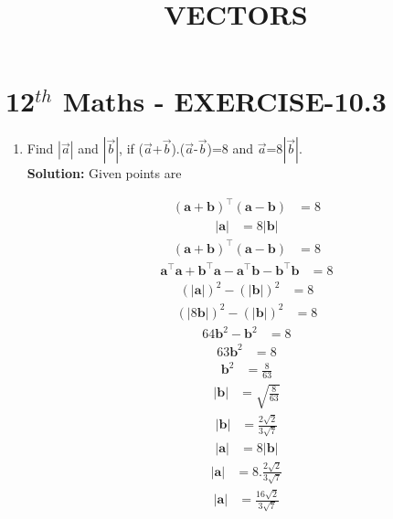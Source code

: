 \documentclass[10pt]{article}
\newcommand{\solution}{\noindent \textbf{Solution: }}
\providecommand{\abs}[1]{\left\vert#1\right\vert}
\let\vec\mathbf{}
\begin{document}
\begin{center}
\title{\textbf{VECTORS}}
\date{\vspace{-5ex}} %
\maketitle
\end{center}

\section{12$^{th}$ Maths - EXERCISE-10.3}

\begin{enumerate}
\item Find $\abs{\overrightarrow{a}}$ and $\abs{\overrightarrow{b}}$, if ($\overrightarrow{a}$+$\overrightarrow{b}$)$.$($\overrightarrow{a}$-$\overrightarrow{b}$)=8 and ${\overrightarrow{a}}$=8$\abs{\overrightarrow{b}}$.\\  

\solution
Given  points are

\begin{align}
(\vec{a}+\vec{b})^{\top}(\vec{a}-\vec{b})&=8
\end{align}
\begin{align}
\abs{\vec{a}}&=8\abs{\vec{b}}
\end{align}
\begin{align}
(\vec{a}+\vec{b})^{\top}(\vec{a}-\vec{b})&=8
\end{align}
\begin{align}
\vec{a}^{\top}\vec{a}+\vec{b}^{\top}\vec{a}-\vec{a}^{\top}\vec{b}-\vec{b}^{\top}\vec{b}&=8
\end{align}
\begin{align}
(\abs{\vec{a}})^2-(\abs{\vec{b}})^2&=8
\end{align}
\begin{align}
(\abs{8\vec{b}})^2-(\abs{\vec{b}})^2&=8
\end{align}
\begin{align}
64{\vec{b}}^2-\vec{b}^2&=8
\end{align}
\begin{align}
63{\vec{b}}^2&=8
\end{align}
\begin{align}
\vec{b}^2&=\frac{8}{63}
\end{align}
\begin{align}
\abs{\vec{b}}&=\sqrt{\frac{8}{63}}
\end{align}
\begin{align}
\abs{\vec{b}}&=\frac{2\sqrt{2}}{3\sqrt{7}}
\end{align}
\begin{align}
\abs{\vec{a}}&=8\abs{\vec{b}}
\end{align}
\begin{align}
\abs{\vec{a}}&=8.\frac{2\sqrt{2}}{3\sqrt{7}}
\end{align}
\begin{align}
\abs{\vec{a}}&=\frac{16\sqrt{2}}{3\sqrt{7}}
\end{align}
\end{enumerate}
\end{document}
